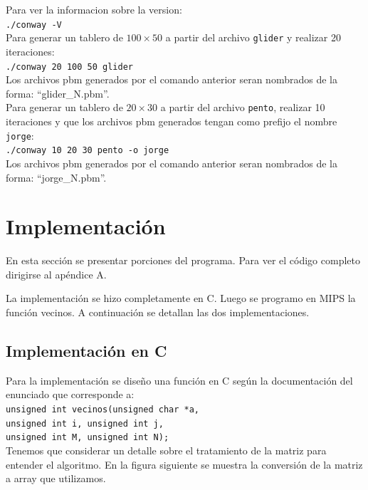 \documentclass[11pt,a4paper]{article}
\begin{document}
Para ver la informacion sobre la version:\\

\texttt{./conway -V}\\

Para generar un tablero de $100 \times 50$ a partir del archivo \texttt{glider} y realizar 20 iteraciones:\\

\texttt{./conway 20 100 50 glider}\\

Los archivos pbm generados por el comando anterior seran nombrados de la forma: ``glider\_N.pbm''.\\

Para generar un tablero de $20 \times 30$ a partir del archivo \texttt{pento}, realizar 10 iteraciones y que los archivos pbm generados tengan como prefijo el nombre \texttt{jorge}:\\

\texttt{./conway 10 20 30 pento -o jorge}\\

Los archivos pbm generados por el comando anterior seran nombrados de la forma: ``jorge\_N.pbm''.



\section{Implementación}
En esta sección se presentar porciones del programa. Para ver el código completo dirigirse al apéndice A.

La implementación se hizo completamente en C. Luego se programo en MIPS la función vecinos. A continuación se detallan las dos implementaciones.

\subsection{Implementación en C}

Para la implementación se diseño una función en C según la documentación del enunciado que corresponde a:\\
\texttt{unsigned int vecinos(unsigned char *a,\\
	unsigned int i, unsigned int j,\\
	unsigned int M, unsigned int N);}\\

Tenemos que considerar un detalle sobre el tratamiento de la matriz para entender el algoritmo. En la figura siguiente se muestra la conversión de la matriz a array que utilizamos.
\end{document}
